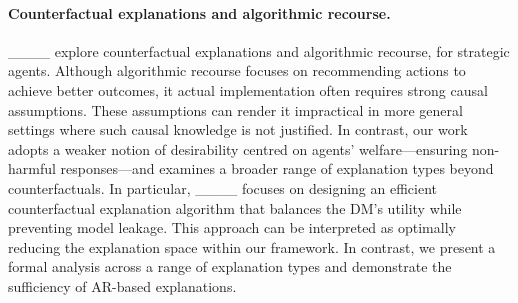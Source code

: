 \paragraph{Counterfactual explanations and algorithmic recourse.} ____ explore counterfactual explanations and algorithmic recourse, for strategic agents. Although algorithmic recourse focuses on recommending actions to achieve better outcomes, it actual implementation often requires strong causal assumptions. These assumptions can render it impractical in more general settings where such causal knowledge is not justified.
In contrast, our work adopts a weaker notion of desirability centred on agents' welfare---ensuring non-harmful responses---and examines a broader range of explanation types beyond counterfactuals.
In particular, ____ focuses on designing an efficient counterfactual explanation algorithm that balances the DM's utility while preventing model leakage. This approach can be interpreted as optimally reducing the explanation space within our framework. In contrast, we present a formal analysis across a range of explanation types and demonstrate the sufficiency of AR-based explanations.


